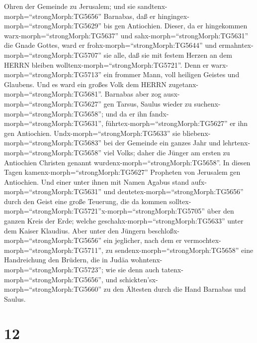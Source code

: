 Ohren der Gemeinde zu Jerusalem; und sie
sandtenx-morph=``strongMorph:TG5656'' Barnabas, daß er
hingingex-morph=``strongMorph:TG5629'' bis gen Antiochien. 
Dieser, da er hingekommen warx-morph=``strongMorph:TG5637'' und
sahx-morph=``strongMorph:TG5631'' die Gnade Gottes, ward er
frohx-morph=``strongMorph:TG5644'' und
ermahntex-morph=``strongMorph:TG5707'' sie alle, daß sie mit festem
Herzen an dem HERRN bleiben wolltenx-morph=``strongMorph:TG5721''.
 Denn er warx-morph=``strongMorph:TG5713'' ein frommer
Mann, voll heiligen Geistes und Glaubens. Und es ward ein großes Volk
dem HERRN zugetanx-morph=``strongMorph:TG5681''.  Barnabas
aber zog ausx-morph=``strongMorph:TG5627'' gen Tarsus, Saulus wieder zu
suchenx-morph=``strongMorph:TG5658'';  und da er ihn
fandx-morph=``strongMorph:TG5631'', führtex-morph=``strongMorph:TG5627''
er ihn gen Antiochien. Undx-morph=``strongMorph:TG5633'' sie
bliebenx-morph=``strongMorph:TG5683'' bei der Gemeinde ein ganzes Jahr
und lehrtenx-morph=``strongMorph:TG5658'' viel Volks; daher die Jünger
am ersten zu Antiochien Christen genannt
wurdenx-morph=``strongMorph:TG5658''.  In diesen Tagen
kamenx-morph=``strongMorph:TG5627'' Propheten von Jerusalem gen
Antiochien.  Und einer unter ihnen mit Namen Agabus stand
aufx-morph=``strongMorph:TG5631'' und
deutetex-morph=``strongMorph:TG5656'' durch den Geist eine große
Teuerung, die da kommen
solltex-morph=``strongMorph:TG5721''x-morph=``strongMorph:TG5705'' über
den ganzen Kreis der Erde; welche geschahx-morph=``strongMorph:TG5633''
unter dem Kaiser Klaudius.  Aber unter den Jüngern
beschloßx-morph=``strongMorph:TG5656'' ein jeglicher, nach dem er
vermochtex-morph=``strongMorph:TG5711'', zu
sendenx-morph=``strongMorph:TG5658'' eine Handreichung den Brüdern, die
in Judäa wohntenx-morph=``strongMorph:TG5723'';  wie sie
denn auch tatenx-morph=``strongMorph:TG5656'', und
schickten'sx-morph=``strongMorph:TG5660'' zu den Ältesten durch die Hand
Barnabas und Saulus.

\hypertarget{section-11}{%
\section{12}\label{section-11}}

